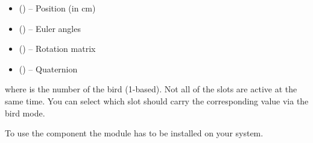 \begin{itemize}
\item {} () -- Position (in cm)
\item {} () -- Euler angles
\item {} () -- Rotation matrix
\item {} () -- Quaternion
\end{itemize}

where  is the number of the bird (1-based). Not all of the
slots are active at the same time. You can select which slot should
carry the corresponding value via the bird mode.

\begin{notice}[note]
To use the  component the
 module has to be 
installed on your system.
\end{notice}

